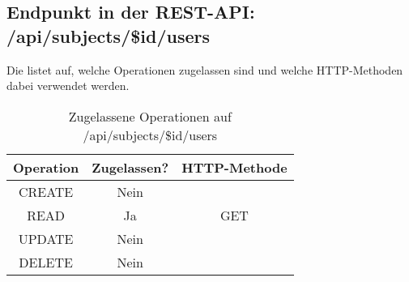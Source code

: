 \subsection{Endpunkt in der REST-API: /api/subjects/\$id/users}
Die  listet auf, welche Operationen zugelassen sind und welche HTTP-Methoden dabei verwendet werden. 

\begin{table}[!htbp]
	\begin{tabular}{|c|c|c|}
		\hline
			\textbf{Operation} & \textbf{Zugelassen?} & \textbf{HTTP-Methode} \\ \hline
			CREATE & Nein & \\ \hline 
			READ & Ja & GET \\ \hline
			UPDATE & Nein & \\ \hline 
			DELETE & Nein & \\ \hline
	\end{tabular}

		\caption{Zugelassene Operationen auf /api/subjects/\$id/users}
		\label{tab:rest:api:subjects:id:users:meth}
\end{table}

